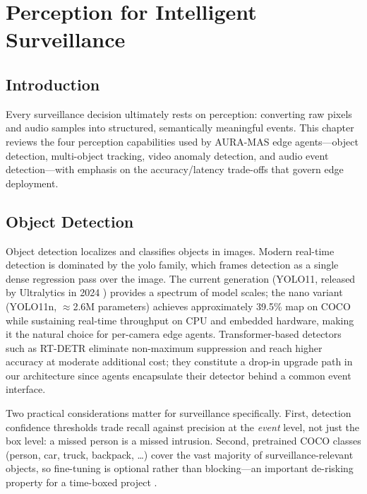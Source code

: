 \chapter{Perception for Intelligent Surveillance}
\label{chap:background_perception}

\section{Introduction}

Every surveillance decision ultimately rests on perception: converting raw pixels and audio samples into structured, semantically meaningful events. This chapter reviews the four perception capabilities used by AURA-MAS edge agents---object detection, multi-object tracking, video anomaly detection, and audio event detection---with emphasis on the accuracy/latency trade-offs that govern edge deployment.

\section{Object Detection}

Object detection localizes and classifies objects in images. Modern real-time detection is dominated by the \gls{yolo} family, which frames detection as a single dense regression pass over the image. The current generation (YOLO11, released by Ultralytics in 2024 \cite{ultralytics2025yolov8}) provides a spectrum of model scales; the nano variant (YOLO11n, $\approx$2.6M parameters) achieves approximately 39.5\% \gls{map} on COCO while sustaining real-time throughput on CPU and embedded hardware, making it the natural choice for per-camera edge agents. Transformer-based detectors such as RT-DETR \cite{ultralytics2025rtdetr} eliminate non-maximum suppression and reach higher accuracy at moderate additional cost; they constitute a drop-in upgrade path in our architecture since agents encapsulate their detector behind a common event interface.

Two practical considerations matter for surveillance specifically. First, detection confidence thresholds trade recall against precision at the \emph{event} level, not just the box level: a missed person is a missed intrusion. Second, pretrained COCO classes (person, car, truck, backpack, \ldots) cover the vast majority of surveillance-relevant objects, so fine-tuning is optional rather than blocking---an important de-risking property for a time-boxed project \cite{encord2024yolo}.

